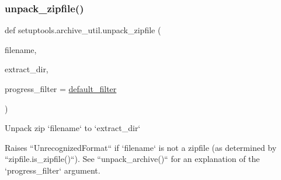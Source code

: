 \subsubsection{\texorpdfstring{unpack\+\_\+zipfile()}{unpack\_zipfile()}}
{\footnotesize\ttfamily def setuptools.\+archive\+\_\+util.\+unpack\+\_\+zipfile (\begin{DoxyParamCaption}\item[{}]{filename,  }\item[{}]{extract\+\_\+dir,  }\item[{}]{progress\+\_\+filter = {\ttfamily \hyperlink{namespacesetuptools_1_1archive__util_adede8e93e57be04915ea0d27831b654b}{default\+\_\+filter}} }\end{DoxyParamCaption})}

\begin{DoxyVerb}Unpack zip `filename` to `extract_dir`

Raises ``UnrecognizedFormat`` if `filename` is not a zipfile (as determined
by ``zipfile.is_zipfile()``).  See ``unpack_archive()`` for an explanation
of the `progress_filter` argument.
\end{DoxyVerb}
 